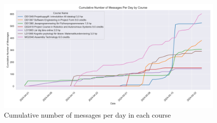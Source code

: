 \begin{figure}[H]
    \centering
    \includegraphics[width=\textwidth]{results/plots/assets/usage-09-number-of-messages-per-day-and-course.png}
    \caption{Cumulative number of messages per day in each course}
    \label{fig:usage_09_number_of_messages_per_day_and_course}
\end{figure}